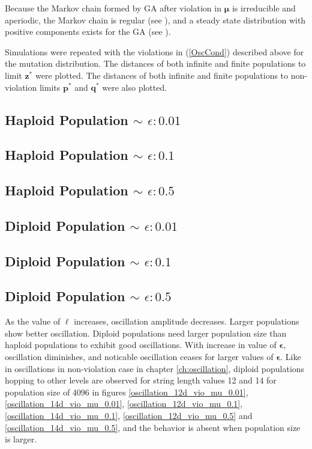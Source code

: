 Because the Markov chain formed by GA after violation in $\bm{\mu}$ is irreducible and aperiodic, 
the Markov chain is regular (see \cite{Iosifescu1980}), and a steady state distribution 
with positive components exists for the GA (see \cite{Minc1988}).   

Simulations were repeated with the violations in (\ref{OscCond}) described above for the mutation distribution.
The distances of both infinite and finite populations to limit $\bm{z}^\ast$ were plotted. 
The distances of both infinite and finite populations to non-violation limits $\bm{p}^\ast$ and $\bm{q}^\ast$ were also plotted.

\subsection{Haploid Population $\mathtt{\sim}$ $\epsilon: 0.01$}

\subsection{Haploid Population $\mathtt{\sim}$ $\epsilon: 0.1$}

\subsection{Haploid Population $\mathtt{\sim}$ $\epsilon: 0.5$}


\subsection{Diploid Population $\mathtt{\sim}$ $\epsilon: 0.01$}

\subsection{Diploid Population $\mathtt{\sim}$ $\epsilon: 0.1$}

\subsection{Diploid Population $\mathtt{\sim}$ $\epsilon: 0.5$}


As the value of $\ell$ increases, oscillation amplitude decreases. 
Larger populations show better oscillation. 
Diploid populations need larger population size than haploid populations to exhibit good oscillations.
With increase in value of $\bm{\epsilon}$, 
oscillation diminishes, and noticable oscillation ceases for larger values of $\bm{\epsilon}$. 
Like in oscillations in non-violation case in chapter \ref{ch:oscillation}, diploid populations hopping to other levels 
are observed for string length values 12 and 14 for population size of 4096 in 
figures \ref{oscillation_12d_vio_mu_0.01}, \ref{oscillation_14d_vio_mu_0.01}, \ref{oscillation_12d_vio_mu_0.1}, 
\ref{oscillation_14d_vio_mu_0.1}, \ref{oscillation_12d_vio_mu_0.5} and \ref{oscillation_14d_vio_mu_0.5}, 
and the behavior is absent when population size is larger.

